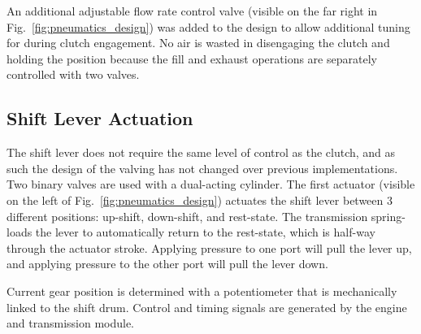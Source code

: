 An additional adjustable flow rate control valve (visible on the far right in Fig.\ \ref{fig:pneumatics_design}) was added to the design to allow additional tuning for during clutch engagement. No air is wasted in disengaging the clutch and holding the position because the fill and exhaust operations are separately controlled with two valves.

\subsection{Shift Lever Actuation}

The shift lever does not require the same level of control as the clutch, and as such the design of the valving has not changed over previous implementations. Two binary valves are used with a dual-acting cylinder. The first actuator (visible on the left of Fig.\ \ref{fig:pneumatics_design}) actuates the shift lever between 3 different positions: up-shift, down-shift, and rest-state. The transmission spring-loads the lever to automatically return to the rest-state, which is half-way through the actuator stroke. Applying pressure to one port will pull the lever up, and applying pressure to the other port will pull the lever down. 

Current gear position is determined with a potentiometer that is mechanically linked to the shift drum. Control and timing signals are generated by the engine and transmission module.

